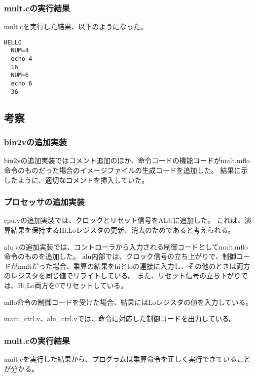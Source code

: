 \subsubsection{mult.cの実行結果}
mult.cを実行した結果、以下のようになった。
\begin{lstlisting}[caption={mult.cの実行結果},label={mult.cの実行結果}]
  HELLO
  NUM=4
  echo 4
  16
  NUM=6
  echo 6
  36
\end{lstlisting}

\subsection{考察}
\subsubsection{bin2vの追加実装}
bin2vの追加実装ではコメント追加のほか、命令コードの機能コードがmult,mflo命令のものだった場合のイメージファイルの生成コードを追加した。
結果に示したように、適切なコメントを挿入していた。

\subsubsection{プロセッサの追加実装}
cpu.vの追加実装では、クロックとリセット信号をALUに追加した。
これは、演算結果を保持するHi,Loレジスタの更新、消去のためであると考えられる。

alu.vの追加実装では、コントローラから入力される制御コードとしてmult,mflo命令のものを追加した。
alu内部では、クロック信号の立ち上がりで、制御コードがmultだった場合、乗算の結果をhiとloの連接に入力し、その他のときは両方のレジスタを同じ値でリライトしている。
また、リセット信号の立ち下がりでは、Hi,Lo両方を0でリセットしている。

mflo命令の制御コードを受けた場合、結果にはLoレジスタの値を入力している。

main\_ctrl.v、alu\_ctrl.vでは、命令に対応した制御コードを出力している。

\subsubsection{mult.cの実行結果}
mult.cを実行した結果から、プログラムは乗算命令を正しく実行できていることが分かる。
